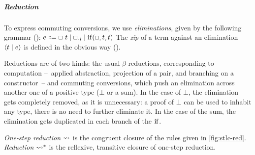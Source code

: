 \documentclass[a4paper,UKenglish,cleveref, autoref, thm-restate]{lipics-v2021}
\begin{document}
\subparagraph*{Reduction}

To express commuting conversions, we use \emph{eliminations},
given by the following grammar ():
\( e \Coloneqq \sapp{t} \mid \sproj{i} \mid \site{t}{t}\)
The \emph{zip} of a term against an elimination \(\plug{e}{t}\) is defined in the obvious way ().

Reductions are of two kinds: the usual \(\beta\)-reductions, corresponding
to computation --~applied abstraction, projection of a pair,
and branching on a constructor~-- and commuting conversions, which push
an elimination across another one of a positive type (\ie \(\bot\) or
a sum). In the case of \(\bot\), the elimination gets completely removed, as it
is unnecessary: a proof of \(\bot\) can be used to inhabit
any type, there is no need to further eliminate it. In the case of the sum,
the elimination gets duplicated in each branch of the \(\iteop\).
\begin{definition}
  \emph{One-step reduction} \(\oredop\)
  is the congruent closure of the rules given in \cref{fig:stlc-red}.
  \emph{Reduction} \(\redop\) is the reflexive, transitive closure of one-step reduction.
\end{definition}
\end{document}
